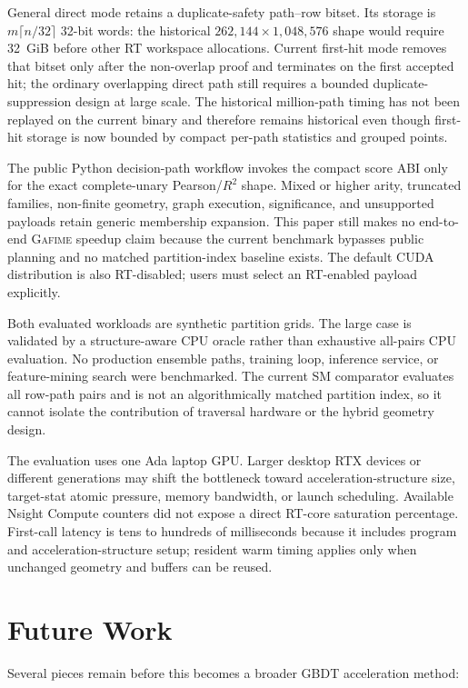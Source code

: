 \documentclass[11pt]{article}
\newcommand{\gafime}{\textsc{Gafime}\xspace}
\begin{document}
General direct mode retains a duplicate-safety path--row bitset. Its storage is
$m\lceil n/32\rceil$ 32-bit words: the historical
$262{,}144\times1{,}048{,}576$ shape would require 32~GiB before other RT
workspace allocations. Current first-hit mode removes that bitset only after the
non-overlap proof and terminates on the first accepted hit; the ordinary
overlapping direct path still requires a bounded duplicate-suppression design at
large scale. The historical million-path timing has not been replayed on the
current binary and therefore remains historical even though first-hit storage is
now bounded by compact per-path statistics and grouped points.

The public Python decision-path workflow invokes the compact score ABI only for
the exact complete-unary Pearson/$R^2$ shape. Mixed or higher arity, truncated
families, non-finite geometry, graph execution, significance, and unsupported
payloads retain generic membership expansion. This paper still makes no
end-to-end \gafime speedup claim because the current benchmark bypasses public
planning and no matched partition-index baseline exists. The default CUDA
distribution is also RT-disabled; users must select an RT-enabled payload
explicitly.

Both evaluated workloads are synthetic partition grids. The large case is
validated by a structure-aware CPU oracle rather than exhaustive all-pairs CPU
evaluation. No production ensemble paths, training loop, inference service, or
feature-mining search were benchmarked. The current SM comparator evaluates all
row-path pairs and is not an algorithmically matched partition index, so it
cannot isolate the contribution of traversal hardware or the hybrid geometry
design.

The evaluation uses one Ada laptop GPU. Larger desktop RTX devices or different
generations may shift the bottleneck toward acceleration-structure size,
target-stat atomic pressure, memory bandwidth, or launch scheduling. Available
Nsight Compute counters did not expose a direct RT-core saturation percentage.
First-call latency is tens to hundreds of milliseconds because it includes
program and acceleration-structure setup; resident warm timing applies only
when unchanged geometry and buffers can be reused.

\section{Future Work}

Several pieces remain before this becomes a broader GBDT acceleration method:
\end{document}
